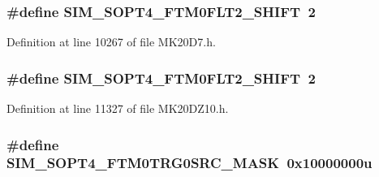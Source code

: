 \subsubsection[{\texorpdfstring{S\+I\+M\+\_\+\+S\+O\+P\+T4\+\_\+\+F\+T\+M0\+F\+L\+T2\+\_\+\+S\+H\+I\+FT}{SIM_SOPT4_FTM0FLT2_SHIFT}}]{\setlength{\rightskip}{0pt plus 5cm}\#define S\+I\+M\+\_\+\+S\+O\+P\+T4\+\_\+\+F\+T\+M0\+F\+L\+T2\+\_\+\+S\+H\+I\+FT~2}\hypertarget{group___s_i_m___register___masks_gacca0c622cfa1e0c7e7214096c38c6557}{}\label{group___s_i_m___register___masks_gacca0c622cfa1e0c7e7214096c38c6557}


Definition at line 10267 of file M\+K20\+D7.\+h.

\subsubsection[{\texorpdfstring{S\+I\+M\+\_\+\+S\+O\+P\+T4\+\_\+\+F\+T\+M0\+F\+L\+T2\+\_\+\+S\+H\+I\+FT}{SIM_SOPT4_FTM0FLT2_SHIFT}}]{\setlength{\rightskip}{0pt plus 5cm}\#define S\+I\+M\+\_\+\+S\+O\+P\+T4\+\_\+\+F\+T\+M0\+F\+L\+T2\+\_\+\+S\+H\+I\+FT~2}\hypertarget{group___s_i_m___register___masks_gacca0c622cfa1e0c7e7214096c38c6557}{}\label{group___s_i_m___register___masks_gacca0c622cfa1e0c7e7214096c38c6557}


Definition at line 11327 of file M\+K20\+D\+Z10.\+h.

\subsubsection[{\texorpdfstring{S\+I\+M\+\_\+\+S\+O\+P\+T4\+\_\+\+F\+T\+M0\+T\+R\+G0\+S\+R\+C\+\_\+\+M\+A\+SK}{SIM_SOPT4_FTM0TRG0SRC_MASK}}]{\setlength{\rightskip}{0pt plus 5cm}\#define S\+I\+M\+\_\+\+S\+O\+P\+T4\+\_\+\+F\+T\+M0\+T\+R\+G0\+S\+R\+C\+\_\+\+M\+A\+SK~0x10000000u}\hypertarget{group___s_i_m___register___masks_ga14159dfb09e3ad4c1b9f2f4950a3f4a6}{}\label{group___s_i_m___register___masks_ga14159dfb09e3ad4c1b9f2f4950a3f4a6}


